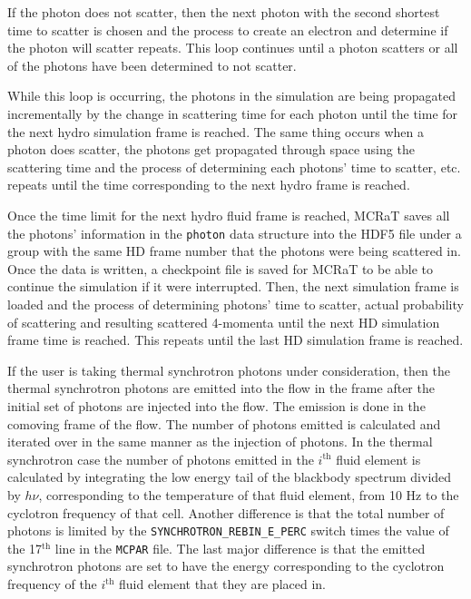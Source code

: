 \documentclass[12pt,a4paper]{article}
\begin{document}
If the photon does not scatter, then the next photon with the second shortest time to scatter is chosen and the process to create an electron and determine if the photon will scatter repeats. This loop continues until a photon scatters or all of the photons have been determined to not scatter. 

While this loop is occurring, the photons in the simulation are being propagated incrementally by the change in scattering time for each photon until the time for the next hydro simulation frame is reached. The same thing occurs when a photon does scatter, the photons get propagated through space using the scattering time and the process of determining each photons' time to scatter, etc. repeats until the time corresponding to the next hydro frame is reached.

Once the time limit for the next hydro fluid frame is reached, MCRaT saves all the photons' information in the \texttt{photon} data structure into the HDF5 file under a group with the same HD frame number that the photons were being scattered in. Once the data is written, a checkpoint file is saved for MCRaT to be able to continue the simulation if it were interrupted. Then, the next simulation frame is loaded and the process of determining photons' time to scatter, actual probability of scattering and resulting scattered 4-momenta until the next HD simulation frame time is reached. This repeats until the last HD simulation frame is reached. 

If the user is taking thermal synchrotron photons under consideration, then the thermal synchrotron photons are emitted into the flow in the frame after the initial set of photons are injected into the flow. The emission is done in the comoving frame of the flow. The number of photons emitted is calculated and iterated over in the same manner as the injection of photons. In the thermal synchrotron case the number of photons emitted in the $i^\mathrm{th}$ fluid element is calculated by integrating the low energy tail of the blackbody spectrum divided by $h\nu$, corresponding to the temperature of that fluid element, from 10 Hz to the cyclotron frequency of that cell. Another difference is that the total number of photons is limited by the \texttt{SYNCHROTRON\_REBIN\_E\_PERC} switch times the value of the 17$^\textrm{th}$ line in the \texttt{MCPAR} file. The last major difference is that the emitted synchrotron photons are set to have the energy corresponding to the cyclotron frequency of the $i^\mathrm{th}$ fluid element that they are placed in.
\end{document}
